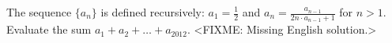 \problem
The sequence $\{a_n\}$ is defined recursively:
$a_1 = \frac{1}{2}$ and
$a_n = \frac{a_{n-1}}{2n \cdot a_{n-1} + 1}$ for $n > 1$.
Evaluate the sum $a_1 + a_2 + \ldots + a_{2012}$.
\solution
<FIXME: Missing English solution.>
\endproblem
